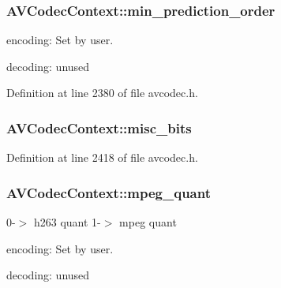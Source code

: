 \subsubsection[{\texorpdfstring{min\+\_\+prediction\+\_\+order}{min_prediction_order}}]{ A\+V\+Codec\+Context\+::min\+\_\+prediction\+\_\+order}\hypertarget{struct_a_v_codec_context_a924de0a448b906ea6de674a3982d575e}{}\label{struct_a_v_codec_context_a924de0a448b906ea6de674a3982d575e}

\begin{DoxyItemize}
\item encoding\+: Set by user.
\item decoding\+: unused 
\end{DoxyItemize}

Definition at line 2380 of file avcodec.\+h.

\subsubsection[{\texorpdfstring{misc\+\_\+bits}{misc_bits}}]{ A\+V\+Codec\+Context\+::misc\+\_\+bits}\hypertarget{struct_a_v_codec_context_ac1316f12a3e77a1e28044d537bb58cca}{}\label{struct_a_v_codec_context_ac1316f12a3e77a1e28044d537bb58cca}


Definition at line 2418 of file avcodec.\+h.

\subsubsection[{\texorpdfstring{mpeg\+\_\+quant}{mpeg_quant}}]{ A\+V\+Codec\+Context\+::mpeg\+\_\+quant}\hypertarget{struct_a_v_codec_context_a1ee77728beef26e1b3b6ff3cc9b27433}{}\label{struct_a_v_codec_context_a1ee77728beef26e1b3b6ff3cc9b27433}
0-\/$>$ h263 quant 1-\/$>$ mpeg quant
\begin{DoxyItemize}
\item encoding\+: Set by user.
\item decoding\+: unused 
\end{DoxyItemize}

